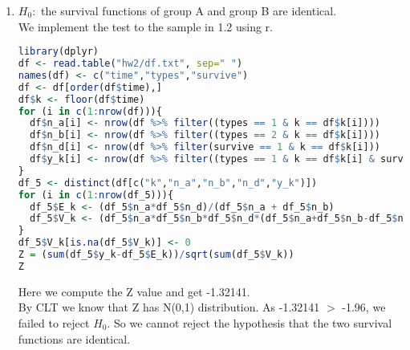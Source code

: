\documentclass[11pt]{article}
\begin{document}
\begin{enumerate}
\begin{align*}
& (According \;to \;iid \;assumption \;of \;k)\\
& = Var[E[\sum \limits_{k=1}^{K-1} (y^{(k)} - E^{(k)})|(n_A^{(K)},n_B^{(K)},n_d^{(K)})]+0]+ E[Var[\sum \limits_{k=1}^{K-1} (y^{(k)} - E^{(k)})|(n_A^{(K)},n_B^{(K)},n_d^{(K)})]+\\
& Var[(y^{(K)} - E^{(K)})|(n_A^{(K)},n_B^{(K)},n_d^{(K)})]]\\
& = Var[\sum \limits_{k=1}^{K-1} (y^{(k)} - E^{(k)})]+ E[Var[(y^{(K)} - E^{(K)})|(n_A^{(K)},n_B^{(K)},n_d^{(K)})]]\\
& = Var[\sum \limits_{k=1}^{K-1} (y^{(k)} - E^{(k)})] + E[V^{(K)}]
\end{align*}
Similarly, we can apply this process to every other value of k, and get that:\\
$$Var[\sum \limits_{k=1}^K (y^{(k)} - E^{(k)})] = \sum \limits_{k=1}^{K}E[V^{(K)}]$$


\item
$H_0:$ the survival functions of group A and group B are identical.\\
We implement the test to the sample in 1.2 using r.
\begin{lstlisting}[language=R]
library(dplyr)
df <- read.table("hw2/df.txt", sep=" ")
names(df) <- c("time","types","survive")
df <- df[order(df$time),]
df$k <- floor(df$time)
for (i in c(1:nrow(df))){
  df$n_a[i] <- nrow(df %>% filter((types == 1 & k == df$k[i])))
  df$n_b[i] <- nrow(df %>% filter((types == 2 & k == df$k[i])))
  df$n_d[i] <- nrow(df %>% filter(survive == 1 & k == df$k[i]))
  df$y_k[i] <- nrow(df %>% filter((types == 1 & k == df$k[i] & survive == 1)))
}
df_5 <- distinct(df[c("k","n_a","n_b","n_d","y_k")])
for (i in c(1:nrow(df_5))){
  df_5$E_k <- (df_5$n_a*df_5$n_d)/(df_5$n_a + df_5$n_b)
  df_5$V_k <- (df_5$n_a*df_5$n_b*df_5$n_d*(df_5$n_a+df_5$n_b-df_5$n_d))/(((df_5$n_a+df_5$n_b)**2)*(df_5$n_a+df_5$n_b-1))
}
df_5$V_k[is.na(df_5$V_k)] <- 0
Z = (sum(df_5$y_k-df_5$E_k))/sqrt(sum(df_5$V_k))
Z
\end{lstlisting}
Here we compute the Z value and get -1.32141.\\
By CLT we know that Z has N(0,1) distribution. As -1.32141 $>$ -1.96, we failed to reject $H_0.$
So we cannot reject the hypothesis that the two survival functions are identical.\\


\end{enumerate}
\end{document}
